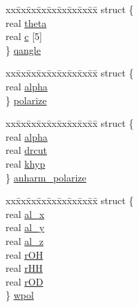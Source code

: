 \begin{DoxyCompactItemize}
\begin{tabbing}
\end{tabbing}\item 
\begin{tabbing}
xx\=xx\=xx\=xx\=xx\=xx\=xx\=xx\=xx\=\kill
struct \{\\
\>real \hyperlink{uniont__iparams_a87d29a37003ac66af358bf2d56c28dd7}{theta}\\
\>real \hyperlink{uniont__iparams_a6f12f82807f6b417c8982bbb5a27af83}{c} \mbox{[}5\mbox{]}\\
\} \hyperlink{uniont__iparams_a43cb92e50f797097c68e55b01d6f0593}{qangle}\\

\end{tabbing}\item 
\begin{tabbing}
xx\=xx\=xx\=xx\=xx\=xx\=xx\=xx\=xx\=\kill
struct \{\\
\>real \hyperlink{uniont__iparams_a1ba2fc2db2b806987876aa29c1702db4}{alpha}\\
\} \hyperlink{uniont__iparams_a53a0543bd6cd770cff2abc3a914b42ab}{polarize}\\

\end{tabbing}\item 
\begin{tabbing}
xx\=xx\=xx\=xx\=xx\=xx\=xx\=xx\=xx\=\kill
struct \{\\
\>real \hyperlink{uniont__iparams_a1ba2fc2db2b806987876aa29c1702db4}{alpha}\\
\>real \hyperlink{uniont__iparams_aafbc5702044534aeaa91cbb68600c9aa}{drcut}\\
\>real \hyperlink{uniont__iparams_a46523e73f4861b4ebdb88df69804b3ae}{khyp}\\
\} \hyperlink{uniont__iparams_a14fcc8a56374ba4b43183380124f8424}{anharm\_polarize}\\

\end{tabbing}\item 
\begin{tabbing}
xx\=xx\=xx\=xx\=xx\=xx\=xx\=xx\=xx\=\kill
struct \{\\
\>real \hyperlink{uniont__iparams_a566ef51c174fb6c3b0872654947bdde1}{al\_x}\\
\>real \hyperlink{uniont__iparams_aefc952edd1a976509d356fdfae8bf06a}{al\_y}\\
\>real \hyperlink{uniont__iparams_a73614f5abd375b70a86d6494d1df4a81}{al\_z}\\
\>real \hyperlink{uniont__iparams_aef7ea02512092933a2c0ea4e23022e9b}{rOH}\\
\>real \hyperlink{uniont__iparams_a507b7c915174e9824702ae722f678c98}{rHH}\\
\>real \hyperlink{uniont__iparams_ad88209b30440d8f970e9356b9534be80}{rOD}\\
\} \hyperlink{uniont__iparams_ac61d33a4e26149e38e39a0677142e850}{wpol}\\


\end{tabbing}
\end{DoxyCompactItemize}
